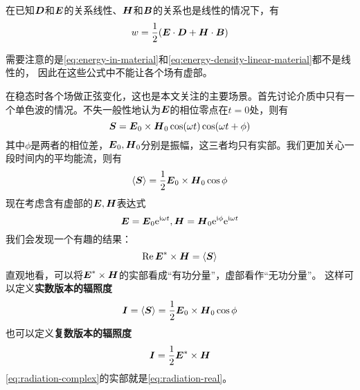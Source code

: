 \documentclass[UTF8, a4paper]{ctexart}
\newcommand*{\ii}{\mathrm{i}}
\newcommand*{\ee}{\mathrm{e}}
\newcommand{\average}[1]{\langle #1 \rangle}
\begin{document}
在已知$\vb*{D}$和$\vb*{E}$的关系线性、$\vb*{H}$和$\vb*{B}$的关系也是线性的情况下，有
\begin{equation}
    w = \frac{1}{2} (\vb*{E} \cdot \vb*{D} + \vb*{H} \cdot \vb*{B})
    \label{eq:energy-density-linear-material}
\end{equation}

需要注意的是\eqref{eq:energy-in-material}和\eqref{eq:energy-density-linear-material}都不是线性的，
因此在这些公式中不能让各个场有虚部。

在稳态时各个场做正弦变化，这也是本文关注的主要场景。首先讨论介质中只有一个单色波的情况。不失一般性地认为$\vb*{E}$的相位零点在$t=0$处，则有
\[
    \vb*{S} = \vb*{E}_0 \times \vb*{H}_0 \cos(\omega t) \cos(\omega t + \phi)
\]
其中$\phi$是两者的相位差，$\vb*{E}_0, \vb*{H}_0$分别是振幅，这三者均只有实部。我们更加关心一段时间内的平均能流，则有
\[
    \average{\vb*{S}} = \frac{1}{2} \vb*{E}_0 \times \vb*{H}_0 \cos \phi
\]
现在考虑含有虚部的$\vb*{E}, \vb*{H}$表达式
\[
    \vb*{E} = \vb*{E}_0 \ee^{\ii \omega t}, \vb*{H} = \vb*{H}_0 \ee^{\ii \phi} \ee^{\ii \omega t}
\]
我们会发现一个有趣的结果：
\[
    \Re \vb*{E}^* \times \vb*{H} = \average{\vb*{S}}
\]
直观地看，可以将$\vb*{E}^* \times \vb*{H}$的实部看成“有功分量”，虚部看作“无功分量”。
这样可以定义\textbf{实数版本的辐照度}
\begin{equation}
    \vb*{I} = \average{\vb*{S}} = \frac{1}{2} \vb*{E}_0 \times \vb*{H}_0 \cos \phi
    \label{eq:radiation-real}
\end{equation}
也可以定义\textbf{复数版本的辐照度}
\begin{equation}
    \vb*{I} = \frac{1}{2} \vb*{E}^* \times \vb*{H}
    \label{eq:radiation-complex}
\end{equation}
\eqref{eq:radiation-complex}的实部就是\eqref{eq:radiation-real}。
\end{document}
